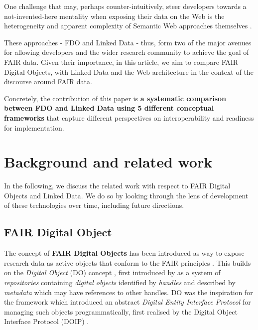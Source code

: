 \documentclass[fleqn,10pt,NOlineno]{wlpeerjlua}
\begin{document}
One challenge that may, perhaps counter-intuitively, steer developers towards a not-invented-here mentality \autocite{stefiDevelopersMakeUnbiased2015,stefiDevelopReuseTwo2015a} when exposing their data on the Web is the heterogeneity and apparent complexity of Semantic Web approaches themselves \autocite{merono-penuelaWebDataApis2021b}.

These approaches - FDO and Linked Data - thus, form two of the major avenues for allowing developers and the wider research community to achieve the goal of FAIR data. Given their importance, in this article, we aim to compare FAIR Digital Objects, with Linked Data and the Web architecture in the context of the discourse around FAIR data.

Concretely, the contribution of this paper is {\bf a systematic comparison between FDO and Linked Data using 5 different conceptual frameworks} that capture different perspectives on interoperability and readiness for implementation.

\section*{Background and related work}\label{sec:background}

In the following, we discuss the related work with respect to FAIR Digital Objects and Linked Data. We do so by looking through the lens of development of these technologies over time, including future directions.

\subsection*{FAIR Digital Object}\label{sec:fdo}

The concept of \textbf{FAIR Digital Objects} \autocite{schultesFAIRPrinciplesDigital2019a} has been introduced as way to expose research data as active objects that conform to the FAIR principles \autocite{wilkinsonFAIRGuidingPrinciples2016e}. This builds on the \emph{Digital Object} (DO) concept \autocite{kahnFrameworkDistributedDigital2006b}, first introduced by \textcite{kahnFrameworkDistributedDigital1995a} as a system of \emph{repositories} containing \emph{digital objects} identified by \emph{handles} and described by \emph{metadata} which may have references to other handles. DO was the inspiration for the \textcite{x1255FrameworkDiscovery} framework which introduced an abstract \emph{Digital Entity Interface Protocol} for managing such objects programmatically, first realised by the Digital Object Interface Protocol (DOIP) \autocite{DigitalObjectInterface}.
\end{document}
